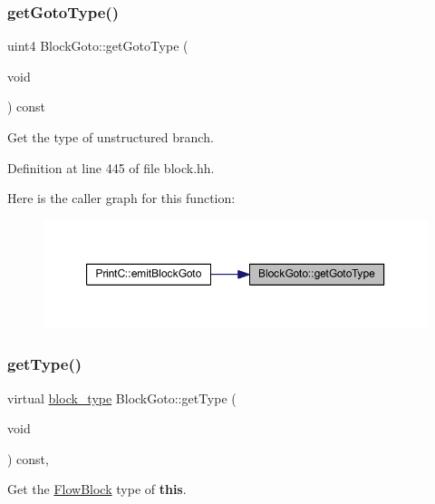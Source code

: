 \subsubsection{\texorpdfstring{getGotoType()}{getGotoType()}}
{\footnotesize\ttfamily uint4 Block\+Goto\+::get\+Goto\+Type (\begin{DoxyParamCaption}\item[{void}]{ }\end{DoxyParamCaption}) const\hspace{0.3cm}{\ttfamily [inline]}}



Get the type of unstructured branch. 



Definition at line 445 of file block.\+hh.

Here is the caller graph for this function\+:
\nopagebreak
\begin{figure}[H]
\begin{center}
\leavevmode
\includegraphics[width=350pt]{class_block_goto_a89799c641a761f1cde85273610a20dfd_icgraph}
\end{center}
\end{figure}
\mbox{\label{class_block_goto_a11f324c0fdd3849a53250a0d67b6c94e}} 
\subsubsection{\texorpdfstring{getType()}{getType()}}
{\footnotesize\ttfamily virtual \mbox{\hyperlink{class_flow_block_a70df78390870fcdd51e31426ba6a193e}{block\+\_\+type}} Block\+Goto\+::get\+Type (\begin{DoxyParamCaption}\item[{void}]{ }\end{DoxyParamCaption}) const\hspace{0.3cm}{\ttfamily [inline]}, {\ttfamily [virtual]}}



Get the \mbox{\hyperlink{class_flow_block}{Flow\+Block}} type of {\bfseries{this}}. 



